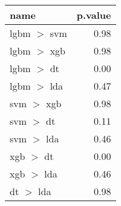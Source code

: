 \begin{tabular}{lr}
  \toprule
{\bfseries name} & {\bfseries p.value} \\ 
  \midrule
lgbm $>$ svm & 0.98 \\ 
  lgbm $>$ xgb & 0.98 \\ 
  lgbm $>$ dt & 0.00 \\ 
  lgbm $>$ lda & 0.47 \\ 
  svm $>$ xgb & 0.98 \\ 
  svm $>$ dt & 0.11 \\ 
  svm $>$ lda & 0.46 \\ 
  xgb $>$ dt & 0.00 \\ 
  xgb $>$ lda & 0.46 \\ 
  dt $>$ lda & 0.98 \\ 
   \bottomrule
\end{tabular}
